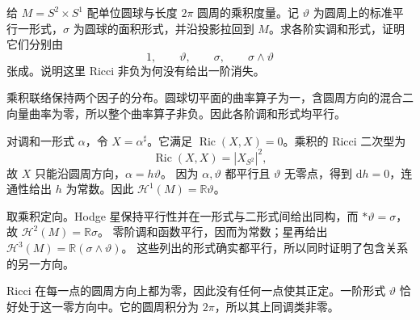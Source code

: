 \begin{exercise}\label{g3:ex:parallel-forms-sphere-circle}
	给 \(M=S^2\times S^1\) 配单位圆球与长度 \(2\pi\) 圆周的乘积度量。记
	\(\vartheta\) 为圆周上的标准平行一形式，\(\sigma\) 为圆球的面积形式，并沿投影拉回到 \(M\)。求各阶实调和形式，证明它们分别由
	\[
		1,\qquad \vartheta,\qquad \sigma,\qquad
		\sigma\wedge\vartheta
	\]
	张成。说明这里 Ricci 非负为何没有给出一阶消失。
\end{exercise}
\begin{solution}
	乘积联络保持两个因子的分布。圆球切平面的曲率算子为一，含圆周方向的混合二向量曲率为零，所以整个曲率算子非负。因此各阶调和形式均平行。

	对调和一形式 \(\alpha\)，令 \(X=\alpha^\sharp\)。它满足
	\(\operatorname{Ric}(X,X)=0\)。乘积的 Ricci 二次型为
	\[
		\operatorname{Ric}(X,X)=|X_{S^2}|^2,
	\]
	故 \(X\) 只能沿圆周方向，\(\alpha=h\vartheta\)。
	因为 \(\alpha,\vartheta\) 都平行且 \(\vartheta\) 无零点，得到
	\(\mathrm dh=0\)，连通性给出 \(h\) 为常数。因此
	\(\mathcal H^1(M)=\mathbb R\vartheta\)。

	取乘积定向。Hodge 星保持平行性并在一形式与二形式间给出同构，而
	\(*\vartheta=\sigma\)，故 \(\mathcal H^2(M)=\mathbb R\sigma\)。
	零阶调和函数平行，因而为常数；星再给出
	\(\mathcal H^3(M)=\mathbb R(\sigma\wedge\vartheta)\)。
	这些列出的形式确实都平行，所以同时证明了包含关系的另一方向。

	Ricci 在每一点的圆周方向上都为零，因此没有任何一点使其正定。一阶形式 \(\vartheta\) 恰好处于这一零方向中。它的圆周积分为 \(2\pi\)，所以其上同调类非零。
\end{solution}

